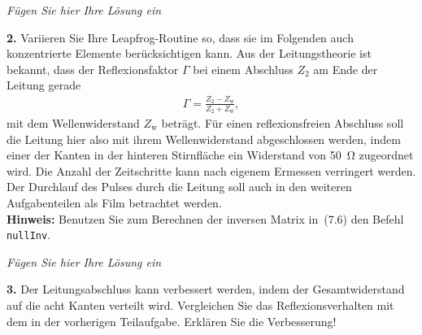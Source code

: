 \documentclass[Protokollheft.tex]{subfiles}
\begin{document}

\emph{Fügen Sie hier Ihre Lösung ein}

\begin{framed}
	\noindent \textbf{2.} Variieren Sie Ihre Leapfrog-Routine so, dass sie im
Folgenden auch konzentrierte Elemente berücksichtigen kann. Aus der Leitungstheorie 
ist bekannt, dass der Reflexionsfaktor $\Gamma$ bei einem Abschluss $Z_{\text{2}}$ am Ende der Leitung gerade 
\begin{align}
 \Gamma=\frac{Z_{\text{2}}-Z_{\text{w}}}{Z_{\text{2}}+Z_{\text{w}}},
\end{align}
mit dem Wellenwiderstand $Z_{\text{w}}$ beträgt. Für einen reflexionsfreien Abschluss soll die 
Leitung hier also mit ihrem Wellenwiderstand abgeschlossen werden,
indem einer der Kanten in der hinteren Stirnfläche ein Widerstand
von \SI{50}{\ohm} zugeordnet wird. Die Anzahl der Zeitschritte kann nach
eigenem Ermessen verringert werden. Der Durchlauf des Pulses durch
die Leitung soll auch in den weiteren Aufgabenteilen als Film
betrachtet werden.\label{exer:simIncludeLumped}\\
\textbf{Hinweis:} Benutzen Sie zum Berechnen der inversen Matrix 
in~(7.6) den Befehl \verb|nullInv|.
%
\end{framed}

\emph{Fügen Sie hier Ihre Lösung ein}

\begin{framed}
	\noindent \textbf{3.} Der Leitungsabschluss kann verbessert werden, indem der Gesamtwiderstand 
auf die acht Kanten verteilt wird. Vergleichen Sie das Reflexionsverhalten
mit dem in der vorherigen Teilaufgabe. Erklären Sie die Verbesserung!\label{exer:distributeTermination}
\end{framed}
\end{document}
